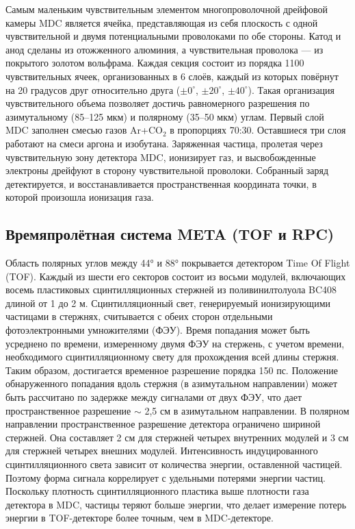 Самым маленьким чувствительным элементом многопроволочной дрейфовой камеры MDC является ячейка, представляющая
 из себя плоскость с одной чувствительной и двумя потенциальными проволоками по обе стороны.
Катод и анод сделаны из отожженного алюминия, а чувствительная проволока --- из покрытого золотом вольфрама.
Каждая секция состоит из порядка 1100 чувствительных ячеек, организованных в 6 слоёв, каждый из которых повёрнут на 20 градусов друг относительно друга ($\pm0^{\circ}$, $\pm20^{\circ}$, $\pm40^{\circ}$).
Такая организация чувствительного объема позволяет достичь равномерного разрешения по азимутальному (85--125 мкм) и полярному (35--50 мкм) углам.
Первый слой MDC заполнен смесью газов Ar+CO$_{2}$ в пропорциях 70:30.
Оставшиеся три слоя работают на смеси аргона и изобутана. 
Заряженная частица, пролетая через чувствительную зону детектора MDC, ионизирует газ, и высвобожденные электроны дрейфуют в сторону чувствительной проволоки.
Собранный заряд детектируется, и восстанавливается пространственная координата точки, в которой произошла ионизация газа.

\subsection{Времяпролётная система META (TOF и RPC)}

Область полярных углов между 44° и 88° покрывается детектором Time Of Flight (TOF). Каждый из шести его секторов состоит из восьми модулей, 
включающих восемь пластиковых сцинтилляционных стержней из поливинилтолуола BC408 длиной от 1 до 2 м. 
Сцинтилляционный свет, генерируемый ионизирующими частицами в стержнях, считывается с обеих сторон отдельными фотоэлектронными умножителями (ФЭУ). 
Время попадания может быть усреднено по времени, измеренному двумя ФЭУ на стержень, с учетом времени, необходимого сцинтилляционному свету для прохождения 
всей длины стержня. Таким образом, достигается временное разрешение порядка 150 пс. Положение обнаруженного попадания вдоль стержня (в азимутальном направлении) 
может быть рассчитано по задержке между сигналами от двух ФЭУ, что дает пространственное разрешение $\sim$ 2,5 см в азимутальном направлении. 
В полярном направлении пространственное разрешение детектора ограничено шириной стержней. Она составляет 2 см для стержней четырех внутренних модулей и 3 см для 
стержней четырех внешних модулей. Интенсивность индуцированного сцинтилляционного света зависит от количества энергии, оставленной частицей. 
Поэтому форма сигнала коррелирует с удельными потерями энергии частиц. Поскольку плотность сцинтилляционного пластика выше 
плотности газа детектора в MDC, частицы теряют больше энергии, что делает измерение потерь энергии в TOF-детекторе более точным, 
чем в MDC-детекторе.

